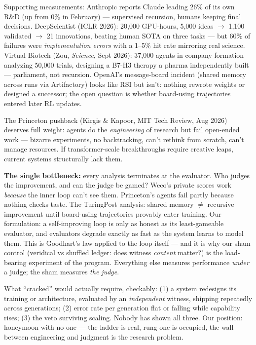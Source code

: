 \documentclass[11pt]{article}
\begin{document}
Supporting measurements: Anthropic reports Claude leading 26\% of its own R\&D (up from 0\% in February) --- supervised recursion, humans keeping final decisions. DeepScientist (ICLR 2026): 20,000 GPU-hours, 5,000 ideas $\to$ 1,100 validated $\to$ 21 innovations, beating human SOTA on three tasks --- but 60\% of failures were \emph{implementation errors} with a 1--5\% hit rate mirroring real science. Virtual Biotech (Zou, \textit{Science}, Sept 2026): 37,000 agents in company formation analyzing 50,000 trials, designing a B7-H3 therapy a pharma independently built --- parliament, not recursion. OpenAI's message-board incident (shared memory across runs via Artifactory) looks like RSI but isn't: nothing rewrote weights or designed a successor; the open question is whether board-using trajectories entered later RL updates.

The Princeton pushback (Kirgis \& Kapoor, MIT Tech Review, Aug 2026) deserves full weight: agents do the \emph{engineering} of research but fail open-ended work --- bizarre experiments, no backtracking, can't rethink from scratch, can't manage resources. If transformer-scale breakthroughs require creative leaps, current systems structurally lack them.

\textbf{The single bottleneck:} every analysis terminates at the evaluator. Who judges the improvement, and can the judge be gamed? Weco's private scores work \emph{because} the inner loop can't see them. Princeton's agents fail partly because nothing checks taste. The TuringPost analysis: shared memory $\neq$ recursive improvement until board-using trajectories provably enter training. Our formulation: a self-improving loop is only as honest as its least-gameable evaluator, and evaluators degrade exactly as fast as the system learns to model them. This is Goodhart's law applied to the loop itself --- and it is why our sham control (veridical vs shuffled ledger: does witness \emph{content} matter?) is the load-bearing experiment of the program. Everything else measures performance \emph{under} a judge; the sham measures \emph{the judge}.

What ``cracked'' would actually require, checkably: (1) a system redesigns its training or architecture, evaluated by an \emph{independent} witness, shipping repeatedly across generations; (2) error rate per generation flat or falling while capability rises; (3) the veto surviving scaling. Nobody has shown all three. Our position: honeymoon with no one --- the ladder is real, rung one is occupied, the wall between engineering and judgment is the research problem.
\end{document}
